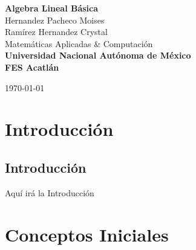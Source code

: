 \documentclass[a4paper,12pt]{report} %
\begin{document}
\begin{titlepage}
    \pagecolor{MidnightBlue}
    \color{white}
    \centering
    {\Huge \textbf{Algebra Lineal Básica}} \\[2.5cm] %
    {\Large Hernandez Pacheco Moises} \\[0.5cm]       %
    {\Large Ramírez Hernandez Crystal} \\[6cm]       %
    \color{SkyBlue}
    {\Large Matemáticas Aplicadas \& Computación} \\[1cm]
    \color{white}
    \textbf{\large Universidad Nacional Autónoma de México} \\[0.5cm]   %
    \textbf{\large FES Acatlán} \\[1cm]   %
    \vfill
    
    \vfill
    {\large \today}                              %
\end{titlepage}

\restoregeometry %

\pagecolor{white}
\color{black}
\hypertarget{toc}{} %
\tableofcontents %

\newpage
\renewcommand{\thechapter}{\Roman{chapter}}
\part{Introducción}
\renewcommand{\thechapter}{\arabic{chapter}}
\chapter{Introducción}
Aquí irá la Introducción

\newpage
\renewcommand{\thechapter}{\Roman{chapter}}
\part{Conceptos Iniciales}
\renewcommand{\thechapter}{\arabic{chapter}}
\end{document}
